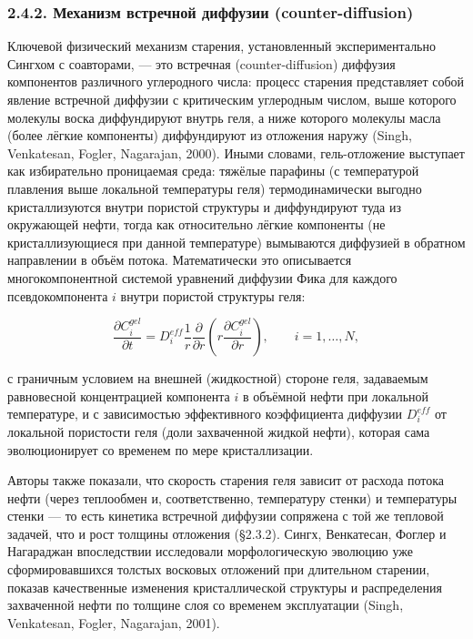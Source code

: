 \documentclass[11pt]{extarticle}
\begin{document}
\subsubsection{2.4.2. Механизм встречной диффузии (counter-diffusion)}\label{ux43cux435ux445ux430ux43dux438ux437ux43c-ux432ux441ux442ux440ux435ux447ux43dux43eux439-ux434ux438ux444ux444ux443ux437ux438ux438-counter-diffusion}

Ключевой физический механизм старения, установленный экспериментально Сингхом с соавторами, --- это встречная (counter-diffusion) диффузия компонентов различного углеродного числа: процесс старения представляет собой явление встречной диффузии с критическим углеродным числом, выше которого молекулы воска диффундируют внутрь геля, а ниже которого молекулы масла (более лёгкие компоненты) диффундируют из отложения наружу (Singh, Venkatesan, Fogler, Nagarajan, 2000). Иными словами, гель-отложение выступает как избирательно проницаемая среда: тяжёлые парафины (с температурой плавления выше локальной температуры геля) термодинамически выгодно кристаллизуются внутри пористой структуры и диффундируют туда из окружающей нефти, тогда как относительно лёгкие компоненты (не кристаллизующиеся при данной температуре) вымываются диффузией в обратном направлении в объём потока. Математически это описывается многокомпонентной системой уравнений диффузии Фика для каждого псевдокомпонента \(i\) внутри пористой структуры геля:

\[
\frac{\partial C_i^{gel}}{\partial t} = D_i^{eff}\frac{1}{r}\frac{\partial}{\partial r}\left(r\frac{\partial C_i^{gel}}{\partial r}\right), \qquad i = 1,\dots,N,
\]

с граничным условием на внешней (жидкостной) стороне геля, задаваемым равновесной концентрацией компонента \(i\) в объёмной нефти при локальной температуре, и с зависимостью эффективного коэффициента диффузии \(D_i^{eff}\) от локальной пористости геля (доли захваченной жидкой нефти), которая сама эволюционирует со временем по мере кристаллизации.

Авторы также показали, что скорость старения геля зависит от расхода потока нефти (через теплообмен и, соответственно, температуру стенки) и температуры стенки --- то есть кинетика встречной диффузии сопряжена с той же тепловой задачей, что и рост толщины отложения (§2.3.2). Сингх, Венкатесан, Фоглер и Нагараджан впоследствии исследовали морфологическую эволюцию уже сформировавшихся толстых восковых отложений при длительном старении, показав качественные изменения кристаллической структуры и распределения захваченной нефти по толщине слоя со временем эксплуатации (Singh, Venkatesan, Fogler, Nagarajan, 2001).
\end{document}
